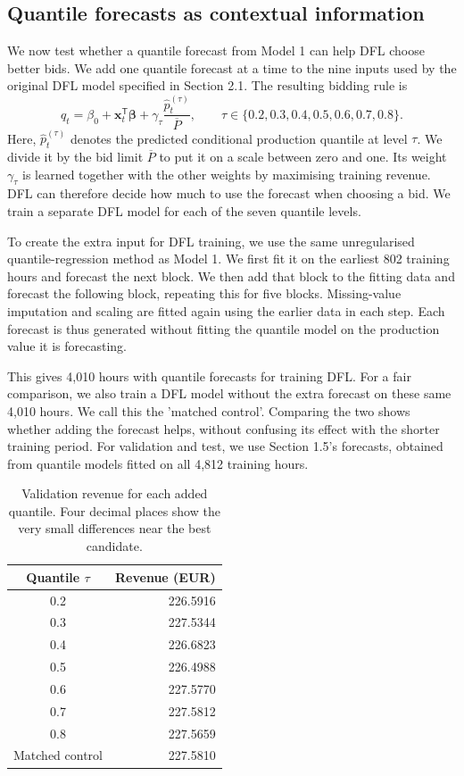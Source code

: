 \subsection{Quantile forecasts as contextual information}
\label{sec:dfl-quantile-context}

We now test whether a quantile forecast from Model 1 can help DFL choose
better bids. We add one quantile forecast at a time to the nine
inputs used by the original DFL model specified in Section 2.1. The resulting bidding rule is
\begin{equation}
 q_t=\beta_0+\boldsymbol{x}_t^{\mathsf T}\boldsymbol{\beta}
 +\gamma_{\tau}\frac{\hat p_t^{(\tau)}}{\overline P},
 \qquad \tau\in\{0.2,0.3,0.4,0.5,0.6,0.7,0.8\}.
\end{equation}
Here, $\hat{p}^{(\tau)}_t$ denotes the predicted conditional production quantile at level $\tau$.
We divide it by the bid limit $\overline{P}$ to put it on a scale between
zero and one. Its weight $\gamma_{\tau}$ is learned together with the
other weights by maximising training revenue. DFL can therefore decide
how much to use the forecast when choosing a bid. We train a separate
DFL model for each of the seven quantile levels.

To create the extra input for DFL training, we use the same unregularised
quantile-regression method as Model 1. We first fit it on the earliest
802 training hours and forecast the next block. We then add that block
to the fitting data and forecast the following block, repeating this for
five blocks. Missing-value imputation and scaling are fitted again using
the earlier data in each step. Each forecast is thus generated without
fitting the quantile model on the production value it is forecasting.

This gives 4,010 hours with quantile forecasts for training DFL.
For a fair comparison, we also train a DFL model without the extra
forecast on these same 4,010 hours. We call this the 'matched control'.
Comparing the two shows whether adding the forecast helps, without
confusing its effect with the shorter training period.
For validation and test, we use Section 1.5's  forecasts, obtained from
quantile models fitted on all 4,812 training hours.

\begin{table}[htbp]
 \centering
 \caption{Validation revenue for each added quantile. Four decimal places
 show the very small differences near the best candidate.}
 \label{tab:context-validation}
 \begin{tabular}{cr}
 \hline
 Quantile $\tau$ & Revenue (EUR)\\
 \hline
 0.2 & 226.5916\\
 0.3 & 227.5344\\
 0.4 & 226.6823\\
 0.5 & 226.4988\\
 0.6 & 227.5770\\
 0.7 & 227.5812\\
 0.8 & 227.5659\\
 \hline
 Matched control & 227.5810\\
 \hline
 \end{tabular}
\end{table}

